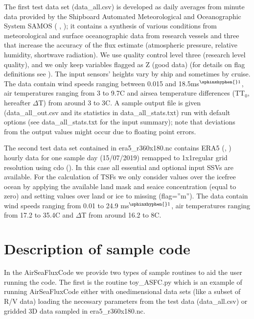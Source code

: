 \documentclass[letterpaper,10pt,english]{sphinxmanual}
\begin{document}
\sphinxAtStartPar
The first test data set (data\_all.csv) is developed as daily averages from minute data provided by the Shipboard Automated Meteorological and Oceanographic System SAMOS ( ,  ); it contains a synthesis of various conditions from meteorological and surface oceanographic data from research vessels and three that increase the accuracy of the flux estimate (atmospheric pressure, relative humidity, shortwave radiation). We use quality control level three (research level quality), and we only keep variables flagged as Z (good data) (for details on flag definitions see ). The input sensors’ heights vary by ship and sometimes by cruise. The data contain wind speeds ranging between 0.015 and 18.5ms$^{\text{\sphinxhyphen{}1}}$, air temperatures ranging from \sphinxhyphen{}3 to 9.7C and air\sphinxhyphen{}sea temperature differences (T\sphinxhyphen{}T$_{\text{0}}$, hereafter \(\Delta\)T) from around \sphinxhyphen{}3 to 3C. A sample output file is given (data\_all\_out.csv and its statistics in data\_all\_stats.txt) run with default options (see data\_all\_stats.txt for the input summary); note that deviations from the output values might occur due to floating point errors.

\sphinxAtStartPar
The second test data set contained in era5\_r360x180.nc contains ERA5 (, ) hourly data for one sample day (15/07/2019) remapped to 1x1regular grid resolution using cdo (). In this case all essential and optional input SSVs are available. For the calculation of TSFs we only consider values over the ice\sphinxhyphen{}free ocean by applying the available land mask and sea\sphinxhyphen{}ice concentration (equal to zero) and setting values over land or ice to missing (flag=”m”). The data contain wind speeds ranging from 0.01 to 24.9 ms$^{\text{\sphinxhyphen{}1}}$, air temperatures ranging from \sphinxhyphen{}17.2 to 35.4C and \(\Delta\)T from around \sphinxhyphen{}16.2 to 8C.


\section{Description of sample code}
\label{\detokenize{getting_started:description-of-sample-code}}
\sphinxAtStartPar
In the AirSeaFluxCode  we provide two types of sample routines to aid the user running the code. The first is the routine toy\_ASFC.py which is an example of running AirSeaFluxCode either with one\sphinxhyphen{}dimensional data sets (like a subset of R/V data) loading the necessary parameters from the test data (data\_all.csv) or gridded 3D data sampled in era5\_r360x180.nc.
\end{document}
